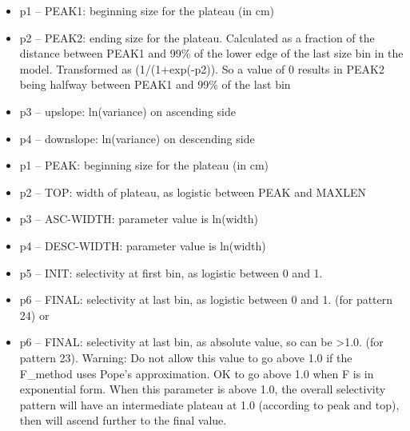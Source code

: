 	\begin{itemize}
		\item p1 – PEAK1:  beginning size for the plateau (in cm)
		\item p2 – PEAK2:  ending size for the plateau.  Calculated as a fraction of the distance between PEAK1 and 99\% of the lower edge of the last size bin in the model.  Transformed as (1/(1+exp(-p2)).   So a value of 0 results in PEAK2 being halfway between PEAK1 and 99\% of the last bin
		\item p3 – upslope:  ln(variance) on ascending side
		\item p4 – downslope:  ln(variance) on descending side
	\end{itemize}

	\begin{itemize}
		\item p1 – PEAK:  beginning size for the plateau (in cm)
		\item p2 – TOP:  width of plateau, as logistic between PEAK and MAXLEN
		\item p3 – ASC-WIDTH:  parameter value is ln(width)
		\item p4 – DESC-WIDTH:  parameter value is ln(width)
		\item p5 – INIT:  selectivity at first bin, as logistic between 0 and 1.
		\item p6 – FINAL: selectivity at last bin, as logistic between 0 and 1.  (for pattern 24) or
		\item p6 – FINAL: selectivity at last bin, as absolute value, so can be >1.0.  (for pattern 23).  Warning:  Do not allow this value to go above 1.0 if the F\_method uses Pope’s approximation.  OK to go above 1.0 when F is in exponential form.  When this parameter is above 1.0, the overall selectivity pattern will have an intermediate plateau at 1.0 (according to peak and top), then will ascend further to the final value.
	\end{itemize}
	
